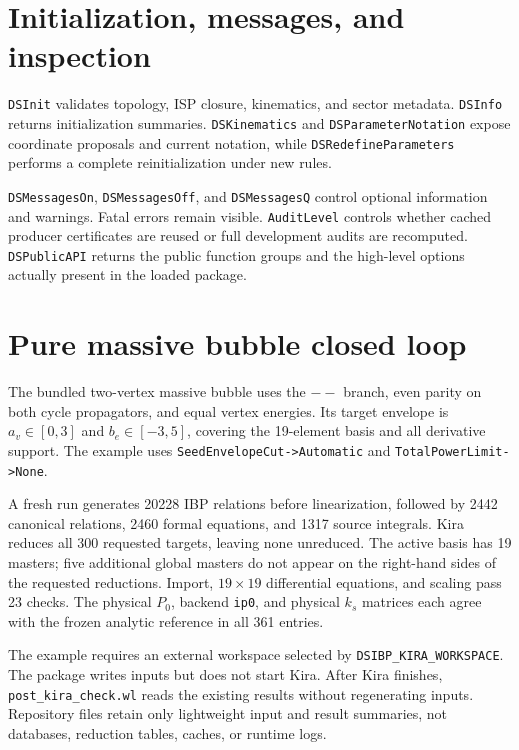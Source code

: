 ﻿\documentclass[a4paper,11pt]{article}
\begin{document}
\section{Initialization, messages, and inspection}

\texttt{DSInit} validates topology, ISP closure, kinematics, and sector metadata.
\texttt{DSInfo} returns initialization summaries. \texttt{DSKinematics} and
\texttt{DSParameterNotation} expose coordinate proposals and current notation, while
\texttt{DSRedefineParameters} performs a complete reinitialization under new rules.

\texttt{DSMessagesOn}, \texttt{DSMessagesOff}, and \texttt{DSMessagesQ} control optional
information and warnings. Fatal errors remain visible. \texttt{AuditLevel} controls whether
cached producer certificates are reused or full development audits are recomputed.
\texttt{DSPublicAPI} returns the public function groups and the high-level options actually
present in the loaded package.

\section{Pure massive bubble closed loop}

The bundled two-vertex massive bubble uses the $--$ branch, even parity on both cycle
propagators, and equal vertex energies. Its target envelope is $a_v\in[0,3]$ and
$b_e\in[-3,5]$, covering the 19-element basis and all derivative support. The example uses
\texttt{SeedEnvelopeCut->Automatic} and \texttt{TotalPowerLimit->None}.

A fresh run generates 20228 IBP relations before linearization, followed by 2442 canonical
relations, 2460 formal equations, and 1317 source integrals. Kira reduces all 300 requested
targets, leaving none unreduced. The active basis has 19 masters; five additional global
masters do not appear on the right-hand sides of the requested reductions. Import,
$19\times19$ differential equations, and scaling pass 23 checks. The physical $P_0$,
backend \texttt{ip0}, and physical $k_s$ matrices each agree with the frozen analytic
reference in all 361 entries.

The example requires an external workspace selected by \texttt{DSIBP\_KIRA\_WORKSPACE}.
The package writes inputs but does not start Kira. After Kira finishes,
\texttt{post\_kira\_check.wl} reads the existing results without regenerating inputs.
Repository files retain only lightweight input and result summaries, not databases,
reduction tables, caches, or runtime logs.
\end{document}
